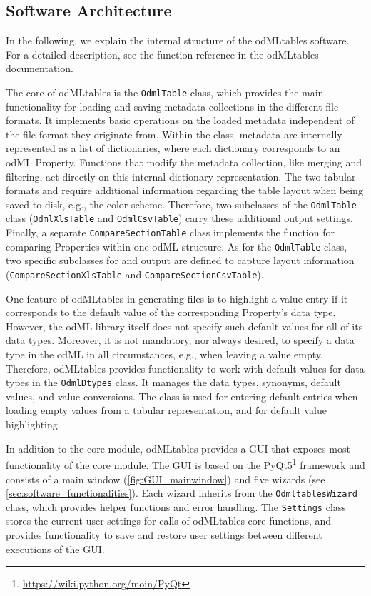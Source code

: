 {\subsection{Software Architecture}
\label{sub:Software-Architecture}

In the following, we explain the internal structure of the odMLtables software. For a detailed description, see the function reference in the odMLtables documentation.

The core of odMLtables is the \texttt{OdmlTable} class, which provides the main functionality for loading and saving metadata collections in the different file formats. It implements basic operations on the loaded metadata independent of the file format they originate from. Within the class, metadata are internally represented as a list of dictionaries, where each dictionary corresponds to an odML Property. Functions that modify the metadata collection, like merging and filtering, act directly on this internal dictionary representation. The two tabular formats  and  require additional information regarding the table layout when being saved to disk, e.g., the color scheme. Therefore, two subclasses of the \texttt{OdmlTable} class (\texttt{OdmlXlsTable} and \texttt{OdmlCsvTable}) carry these additional output settings. Finally, a separate \texttt{CompareSectionTable} class implements the function for comparing Properties within one odML structure. As for the \texttt{OdmlTable} class, two specific subclasses for  and  output are defined to capture layout information (\texttt{CompareSectionXlsTable} and \texttt{CompareSectionCsvTable}).

One feature of odMLtables in generating  files is to highlight a value entry if it corresponds to the default value of the corresponding Property's data type. However, the odML library itself does not specify such default values for all of its data types. Moreover, it is not mandatory, nor always desired, to specify a data type in the odML in all circumstances, e.g., when leaving a value empty. Therefore, odMLtables provides functionality to work with default values for data types in the \texttt{OdmlDtypes} class. It manages the data types, synonyms, default values, and value conversions. The class is used for entering default entries when loading empty values from a tabular representation, and for default value highlighting.

In addition to the core module, odMLtables provides a GUI that exposes most functionality of the core module. The GUI is based on the PyQt5\footnote{\url{https://wiki.python.org/moin/PyQt}} framework and consists of a main window (\cref{fig:GUI_mainwindow}) and five wizards (see \cref{sec:software_functionalities}). Each wizard inherits from the \texttt{OdmltablesWizard} class, which provides helper functions and error handling. The \texttt{Settings} class stores the current user settings for calls of odMLtables core functions, and provides functionality to save and restore user settings between different executions of the GUI.


}
